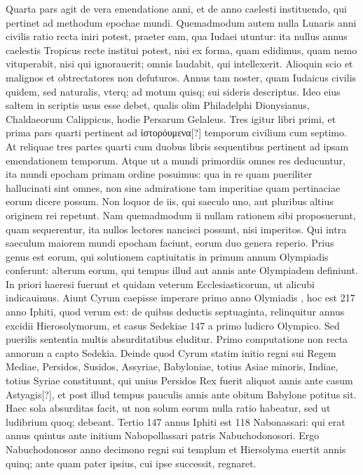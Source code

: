 Quarta pars agit de vera emendatione anni, et
de anno caelesti instituendo, qui pertinet ad methodum epochae
mundi.
Quemadmodum autem nulla Lunaris anni civilis ratio
recta iniri potest, praeter eam, qua Iudaei utuntur: ita nullus annus
caelestis Tropicus recte institui potest, nisi ex forma, quam edidimus,
quam nemo vituperabit, nisi qui ignorauerit; omnis laudabit,
qui intellexerit.
Alioquin scio et malignos et obtrectatores non defuturos. 
Annus tam noster, quam Iudaicus civilis quidem, sed naturalis,
vterq; ad motum quisq; sui sideris descriptus. 
Ideo eius saltem
in scriptis usus esse debet, qualis olim Philadelphi Dionysianus,
Chaldaeorum Calippicus, hodie Persarum Gelaleus. 
Tres igitur libri
primi, et prima pars quarti pertinent ad \textgreek{ἱστορόυμενα[?]}
 temporum civilium
cum septimo.
At reliquae tres partes quarti cum duobus libris
sequentibus pertinent ad ipsam emendationem temporum.
Atque
ut a mundi primordiis omnes res deducuntur, ita mundi epocham
primam ordine posuimus: qua in re quam pueriliter hallucinati sint
omnes, non sine admiratione tam imperitiae quam pertinaciae eorum
dicere possum.
Non loquor de iis, qui saeculo uno, aut pluribus altius
originem rei repetunt.
Nam quemadmodum ii nullam rationem
sibi proposuerunt, quam sequerentur, ita nullos lectores nancisci
possunt, nisi imperitos. 
Qui intra saeculum maiorem mundi
epocham faciunt, eorum duo genera reperio.
Prius genus est eorum,
qui solutionem captiuitatis in primum annum Olympiadis  conferunt:
alterum eorum, qui tempus illud  aut  annis ante
 Olympiadem definiunt.
In priori haeresi fuerunt et
quidam veterum Ecclesiasticorum, ut alicubi indicauimus. 
Aiunt
Cyrum caepisse imperare primo anno Olymiadis , hoc est 217
anno Iphiti, quod verum est: de quibus deductis septuaginta, relinquitur
annus excidii Hierosolymorum, et casus Sedekiae 147 a primo ludicro
Olympico.
Sed puerilis sententia multis absurditatibus eluditur.
Primo computatione non recta annorum  a capto Sedekia.
Deinde quod Cyrum statim initio regni sui Regem Mediae, Persidos,
Susidos, Assyriae, Babyloniae, totius Asiae minoris, Indiae, totius
Syriae constituunt, qui unius Persidos Rex fuerit aliquot annis ante
casum Astyagis[?], et post illud tempus pauculis annis ante obitum
Babylone potitus sit.
Haec sola absurditas facit, ut non solum eorum
nulla ratio habeatur, sed ut ludibrium quoq; debeant.
Tertio 147 annus
Iphiti est 118 Nabonassari: qui erat annus quintus ante initium Nabopollassari
patris Nabuchodonosori.
Ergo Nabuchodonosor anno
decimono regni sui templum et Hiersolyma euertit annis quinq;
ante quam pater ipsius, cui ipse successit, regnaret.

